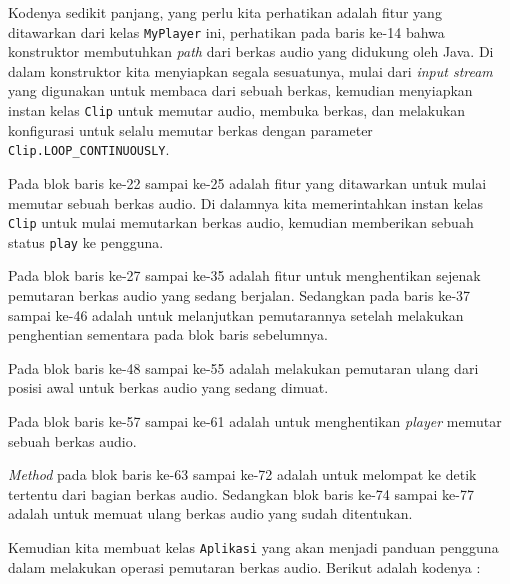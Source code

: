 Kodenya sedikit panjang, yang perlu kita perhatikan adalah fitur yang ditawarkan dari kelas \texttt{MyPlayer} ini, perhatikan pada baris ke-14 bahwa konstruktor membutuhkan \textit{path} dari berkas audio yang didukung oleh Java. Di dalam konstruktor kita menyiapkan segala sesuatunya, mulai dari \textit{input stream} yang digunakan untuk membaca dari sebuah berkas, kemudian menyiapkan instan kelas \texttt{Clip} untuk memutar audio, membuka berkas, dan melakukan konfigurasi untuk selalu memutar berkas dengan parameter \texttt{Clip.LOOP\_CONTINUOUSLY}.

Pada blok baris ke-22 sampai ke-25 adalah fitur yang ditawarkan untuk mulai memutar sebuah berkas audio. Di dalamnya kita memerintahkan instan kelas \texttt{Clip} untuk mulai memutarkan berkas audio, kemudian memberikan sebuah status \texttt{play} ke pengguna.

Pada blok baris ke-27 sampai ke-35 adalah fitur untuk menghentikan sejenak pemutaran berkas audio yang sedang berjalan. Sedangkan pada baris ke-37 sampai ke-46 adalah untuk melanjutkan pemutarannya setelah melakukan penghentian sementara pada blok baris sebelumnya.

Pada blok baris ke-48 sampai ke-55 adalah melakukan pemutaran ulang dari posisi awal untuk berkas audio yang sedang dimuat.

Pada blok baris ke-57 sampai ke-61 adalah untuk menghentikan \textit{player} memutar sebuah berkas audio.

\textit{Method} pada blok baris ke-63 sampai ke-72 adalah untuk melompat ke detik tertentu dari bagian berkas audio. Sedangkan blok baris ke-74 sampai ke-77 adalah untuk memuat ulang berkas audio yang sudah ditentukan.

Kemudian kita membuat kelas \texttt{Aplikasi} yang akan menjadi panduan pengguna dalam melakukan operasi pemutaran berkas audio. Berikut adalah kodenya :

